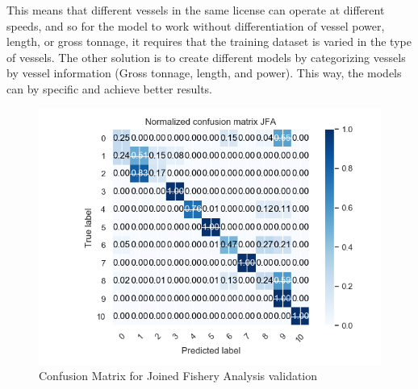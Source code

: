This means that different vessels in the same license can operate at different speeds, and so for the model to work without differentiation of vessel power, length, or gross tonnage, it requires that the training dataset is varied in the type of vessels.
The other solution is to create different models by categorizing vessels by vessel information (Gross tonnage, length, and power). This way, the models can by specific and achieve better results. 

\begin{figure}[H]
\centering
\includegraphics[width=0.8\linewidth]{Chapters/img/val_JFA.png}
\caption{Confusion Matrix for Joined Fishery Analysis validation }
\label{fig:val_jfa}
\end{figure}





